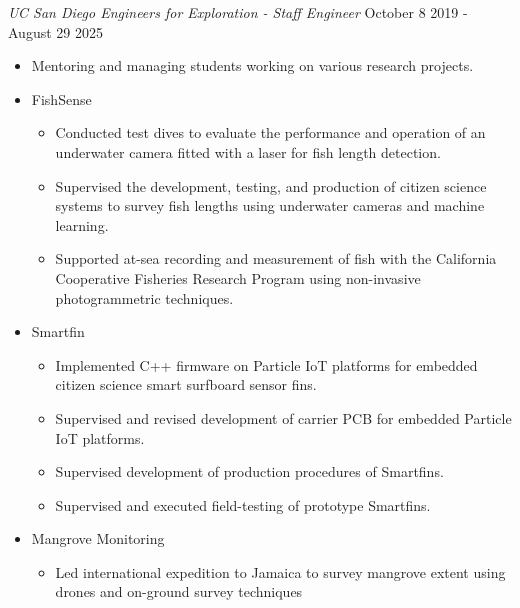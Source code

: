 \documentclass[line,margin]{res}
\begin{document}
\begin{resume}
	{\sl UC San Diego Engineers for Exploration - Staff Engineer} \hfill October 8 2019 - August 29 2025
	\begin{itemize}
		\item Mentoring and managing students working on various research projects.
		\item FishSense
		\begin{itemize}
			\item Conducted test dives to evaluate the performance and operation of an underwater camera fitted with a laser for fish length detection.
			\item Supervised the development, testing, and production of citizen science systems to survey fish lengths using underwater cameras and machine learning.
			\item Supported at-sea recording and measurement of fish with the California Cooperative Fisheries Research Program using non-invasive photogrammetric techniques.
		\end{itemize}
		\item Smartfin
		\begin{itemize}
			\item Implemented C++ firmware on Particle IoT platforms for embedded citizen science smart surfboard sensor fins.
			\item Supervised and revised development of carrier PCB for embedded Particle IoT platforms.
			\item Supervised development of production procedures of Smartfins.
			\item Supervised and executed field-testing of prototype Smartfins.
		\end{itemize}
		\item Mangrove Monitoring
		\begin{itemize}
			\item Led international expedition to Jamaica to survey mangrove extent using drones and on-ground survey techniques
		\end{itemize}
	\end{itemize}


\end{resume}
\end{document}
